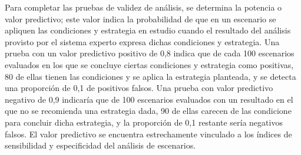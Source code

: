Para completar las pruebas de validez de análisis, se determina la potencia o valor predictivo; este valor indica la probabilidad de que en un escenario se apliquen las condiciones y estrategia en estudio cuando el resultado del análisis provisto por el sistema experto expresa dichas condiciones y estrategia. Una prueba con un valor predictivo positivo de 0,8 indica que de cada 100 escenarios evaluados en los que se concluye ciertas condiciones y estrategia como positivas, 80 de ellas tienen las condiciones y se aplica la estrategia planteada, y se detecta una proporción de 0,1 de positivos falsos. Una prueba con valor predictivo negativo de 0,9 indicaría que de 100 escenarios evaluados con un resultado en el que no se recomienda una estrategia dada, 90 de ellas carecen de las condicione para concluir dicha estrategia, y la proporción de 0,1 restante sería negativos falsos. El valor predictivo se encuentra estrechamente vinculado a los índices de sensibilidad y especificidad del análisis de escenarios.


